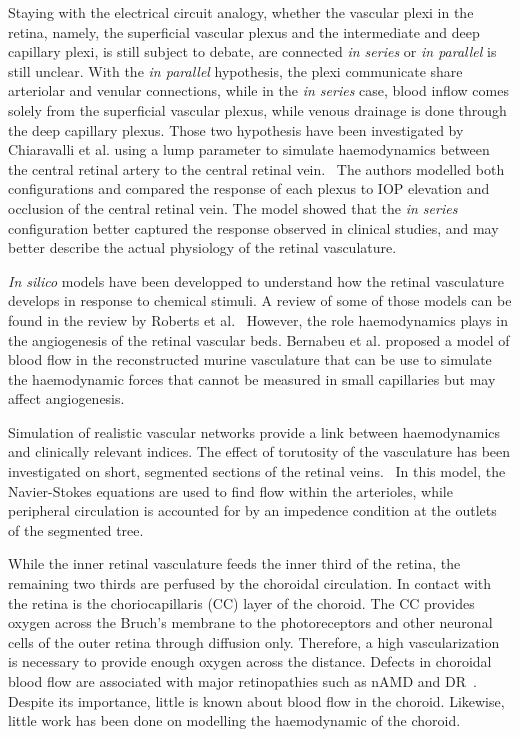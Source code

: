 \documentclass[12pt,a4paper]{journal}
\begin{document}
Staying with the electrical circuit analogy, whether the vascular plexi in the retina, namely, the superficial vascular plexus and the intermediate and deep capillary plexi, is still subject to debate, are connected \textit{in series} or \textit{in parallel} is still unclear.
With the \textit{in parallel} hypothesis, the plexi communicate share arteriolar and venular connections, while in the \textit{in series} case, blood inflow comes solely from the superficial vascular plexus, while venous drainage is done through the deep capillary plexus.
Those two hypothesis have been investigated by Chiaravalli et al. using a lump parameter to simulate haemodynamics between the central retinal artery to the central retinal vein.~\cite{Chiaravalli_2021}
The authors modelled both configurations and compared the response of each plexus to IOP elevation and occlusion of the central retinal vein.
The model showed that the \textit{in series} configuration better captured the response observed in clinical studies, and may better describe the actual physiology of the retinal vasculature.

\textit{In silico} models have been developped to understand how the retinal vasculature develops in response to chemical stimuli.
A review of some of those models can be found in the review by Roberts et al.~\cite{Roberts_2016}
However, the role haemodynamics plays in the angiogenesis of the retinal vascular beds.
Bernabeu et al. proposed a model of blood flow in the reconstructed murine vasculature that can be use to simulate the haemodynamic forces that cannot be measured in small capillaries but may affect angiogenesis.~\cite{Bernabeu_2014} 

Simulation of realistic vascular networks provide a link between haemodynamics and clinically relevant indices.
The effect of torutosity of the vasculature has been investigated on short, segmented sections of the retinal veins.~\cite{Malek_2014}
In this model, the Navier-Stokes equations are used to find flow within the arterioles, while peripheral circulation is accounted for by an impedence condition at the outlets of the segmented tree.

While the inner retinal vasculature feeds the inner third of the retina, the remaining two thirds are perfused by the choroidal circulation.
In contact with the retina is the choriocapillaris (CC) layer of the choroid.
The CC provides oxygen across the Bruch's membrane to the photoreceptors and other neuronal cells of the outer retina through diffusion only.
Therefore, a high vascularization is necessary to provide enough oxygen across the distance.
Defects in choroidal blood flow are associated with major retinopathies such as nAMD and DR~\cite{Pemp_2008}.
Despite its importance, little is known about blood flow in the choroid.
Likewise, little work has been done on modelling the haemodynamic of the choroid.
\end{document}
